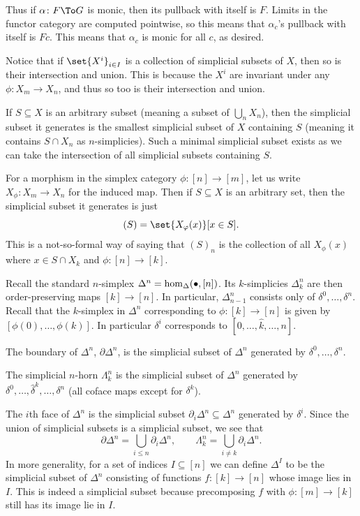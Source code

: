     Thus if $\alpha\colon F\To G$ is monic, then its pullback with itself is $F$.
    Limits in the functor category are computed pointwise, so this means that $\alpha_c$'s pullback with itself is $Fc$.
    This means that $\alpha_c$ is monic for all $c$, as desired.

\enote

Notice that if $\set{X^i}_{i\in I}$ is a collection of simplicial subsets of $X$, then so is their intersection and union.
This is because the $X^i$ are invariant under any $\phi\colon X_m\to X_n$, and thus so too is their intersection and union.

\bdefn

    If $S\subseteq X$ is an arbitrary subset (meaning a subset of $\bigcup_nX_n$), then the simplicial subset it {\emphcolor generates} is the smallest
    simplicial subset of $X$ containing $S$ (meaning it contains $S\cap X_n$ as $n$-simplicies).
    Such a minimal simplicial subset exists as we can take the intersection of all simplicial subsets containing $S$.

\edefn

For a morphism in the simplex category $\phi\colon[n]\to[m]$, let us write $X_\phi\colon X_m\to X_n$ for the induced map.
Then if $S\subseteq X$ is an arbitrary set, then the simplicial subset it generates is just
$$ (S) = \set{X_\phi(x)}[x\in S] . $$
This is a not-so-formal way of saying that $(S)_n$ is the collection of all $X_\phi(x)$ where $x\in S\cap X_k$ and $\phi\colon[n]\to[k]$.

Recall the standard $n$-simplex $\Delta^n=\hom_\Delta(\bullet,[n])$.
Its $k$-simplicies $\Delta^n_k$ are then order-preserving maps $[k]\to[n]$.
In particular, $\Delta^n_{n-1}$ consists only of $\delta^0,\dots,\delta^n$.
Recall that the $k$-simplex in $\Delta^n$ corresponding to $\phi\colon[k]\to[n]$ is given by $[\phi(0),\dots,\phi(k)]$.
In particular $\delta^i$ corresponds to $[0,\dots,\hat k,\dots,n]$.

\bdefn

    The {\emphcolor boundary of $\Delta^n$}, $\partial\Delta^n$, is the simplicial subset of $\Delta^n$ generated by $\delta^0,\dots,\delta^n$.

    The {\emphcolor simplicial $n$-horn} $\Lambda^n_k$ is the simplicial subset of $\Delta^n$ generated by $\delta^0,\dots,\hat\delta^k,\dots,\delta^n$
    (all coface maps except for $\delta^k$).

\edefn

The $i$th face of $\Delta^n$ is the simplicial subset $\partial_i\Delta^n\subseteq\Delta^n$ generated by $\delta^i$.
Since the union of simplicial subsets is a simplicial subset, we see that
$$ \partial\Delta^n = \bigcup_{i\leq n}\partial_i\Delta^n,\qquad \Lambda^n_k = \bigcup_{i\neq k}\partial_i\Delta^n . $$
In more generality, for a set of indices $I\subseteq[n]$ we can define $\Delta^I$ to be the simplicial subset of $\Delta^n$ consisting of functions $f\colon[k]\to[n]$ whose
image lies in $I$.
This is indeed a simplicial subset because precomposing $f$ with $\phi\colon[m]\to[k]$ still has its image lie in $I$.

